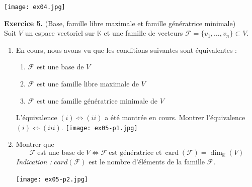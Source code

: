 \documentclass[a4paper, 10pt]{report}
\DeclareMathOperator{\card}{card}
\begin{document}
	\texttt{[image: ex04.jpg]}
	
	\newpage
	
	\noindent
	\textbf{Exercice 5.} (Base, famille libre maximale et famille
	génératrice minimale)\\
	Soit $V$ un espace vectoriel sur $\mathbb{K}$ et une famille
	de vecteurs $\mathcal{F} = \{v_1, \dotsc, v_n\} \subset V$.
	
	\begin{enumerate}[label=(\alph*)]
		\item En cours, nous avons vu que les conditions suivantes
		sont équivalentes :
		\begin{enumerate}[label=(\roman*)]
			\item $\mathcal{F}$ est une base de $V$
			\item $\mathcal{F}$ est une famille
				libre maximale de $V$
			\item $\mathcal{F}$ est une famille
				génératrice minimale de $V$
		\end{enumerate}
		L'équivalence $(i) \iff (ii)$ a été montrée en cours.
		Montrer l'équivalence $(i) \iff (iii)$.
		\texttt{[image: ex05-p1.jpg]}
		\item Montrer que
		\[
			\mathcal{F}\ \text{est une base de}\ V \iff
			\mathcal{F}\ \text{est génératrice et}\
			\card(\mathcal{F}) = \dim_{\mathbb{K}}(V)
		\]
		\textit{Indication :} $card(\mathcal{F})$ est le nombre
		d'éléments de la famille $\mathcal{F}$.
		
		\texttt{[image: ex05-p2.jpg]}
	\end{enumerate}
	
\end{document}
